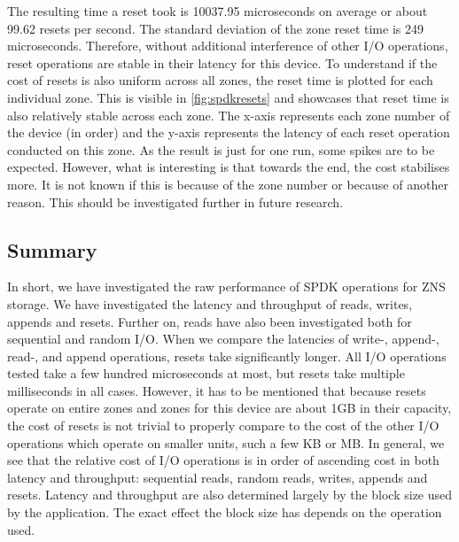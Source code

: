 The resulting time a reset took is 10037.95 microseconds on average or about 99.62 resets per second. The standard deviation of the zone reset time is 249 microseconds. Therefore, without additional interference of other I/O operations, reset operations are stable in their latency for this device. To understand if the cost of resets is also uniform across all zones, the reset time is plotted for each individual zone. This is visible in \autoref{fig:spdkresets} and showcases that reset time is also relatively stable across each zone. The x-axis represents each zone number of the device (in order) and the y-axis represents the latency of each reset operation conducted on this zone. As the result is just for one run, some spikes are to be expected. However, what is interesting is that towards the end, the cost stabilises more. It is not known if this is because of the zone number or because of another reason. This should be investigated further in future research. 

\subsection{Summary}
In short, we have investigated the raw performance of SPDK operations for ZNS storage. We have investigated the latency and throughput of reads, writes, appends and resets. Further on, reads have also been investigated both for sequential and random I/O. When we compare the latencies of write-, append-, read-, and append operations, resets take significantly longer. All I/O operations tested take a few hundred microseconds at most, but resets take multiple milliseconds in all cases. However, it has to be mentioned that because resets operate on entire zones and zones for this device are about 1GB in their capacity, the cost of resets is not trivial to properly compare to the cost of the other I/O operations which operate on smaller units, such a few KB or MB. In general, we see that the relative cost of I/O operations is in order of ascending cost in both latency and throughput: sequential reads, random reads, writes, appends and resets. Latency and throughput are also determined largely by the block size used by the application. The exact effect the block size has depends on the operation used. 

